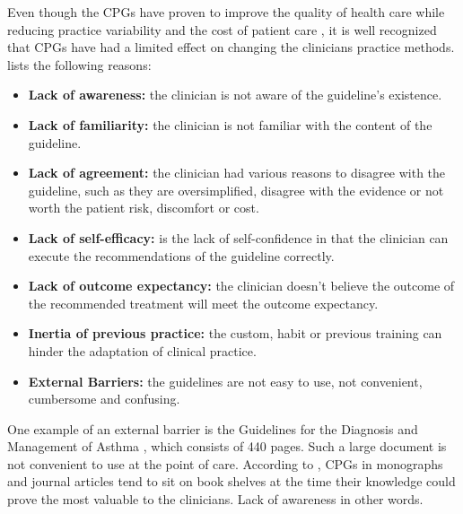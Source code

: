 Even though the CPGs have proven to improve the quality of health care while reducing practice variability and the cost of patient care \parencite{DeClercq2008}, it is well recognized that CPGs have had a limited effect on changing the clinicians practice methods. \textcite{Cabana1999} lists the following reasons:
\begin{itemize}
	\item \textbf{Lack of awareness:} the clinician is not aware of the guideline's existence.
	\item \textbf{Lack of familiarity:} the clinician is not familiar with the content of the guideline.
	\item \textbf{Lack of agreement:} the clinician had various reasons to disagree with the guideline, such as they are oversimplified, disagree with the evidence or not worth the patient risk, discomfort or cost.
	\item \textbf{Lack of self-efficacy:} is the lack of self-confidence in that the clinician can execute the recommendations of the guideline correctly.
	\item \textbf{Lack of outcome expectancy:} the clinician doesn't believe the outcome of the recommended treatment will meet the outcome expectancy.
	\item \textbf{Inertia of previous practice:} the custom, habit or previous training can hinder the adaptation of clinical practice.
	\item \textbf{External Barriers:} the guidelines are not easy to use, not convenient, cumbersome and confusing.
\end{itemize}One example of an external barrier is the Guidelines for the Diagnosis and Management of Asthma \parencite{NationalHeartLungandBloodInstitute2007}, which consists of 440 pages. Such a large document is not convenient to use at the point of care. According to \textcite{Shortliffe1998}, CPGs in monographs and journal articles tend to sit on book shelves at the time their knowledge could prove the most valuable to the clinicians. Lack of awareness in other words.

